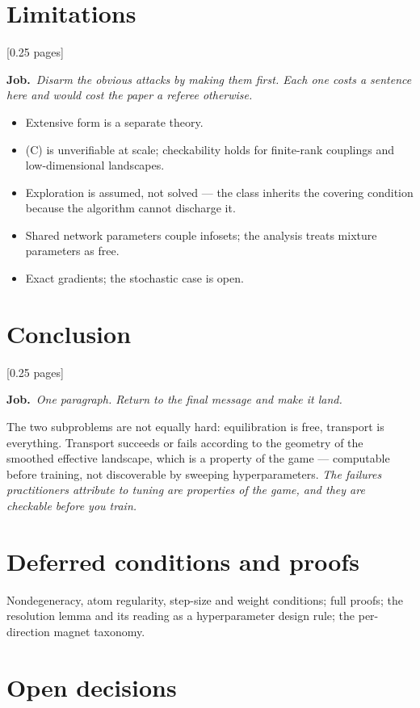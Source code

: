 \documentclass[11pt]{article}
\newcommand{\job}[1]{\par\smallskip\noindent
  \textcolor{jobc}{\textbf{Job.}}\ \emph{#1}\par\smallskip}
\newcommand{\budget}[1]{\hfill{\small\textsf{[#1]}}}
\theoremstyle{definition}
\theoremstyle{remark}
\begin{document}
\section{Limitations}\label{sec:limits}
\budget{0.25 pages}

\job{Disarm the obvious attacks by making them first. Each one costs a sentence
here and would cost the paper a referee otherwise.}
\begin{itemize}[leftmargin=1.2em]
\item Extensive form is a separate theory.
\item (C) is unverifiable at scale; checkability holds for finite-rank couplings
  and low-dimensional landscapes.
\item Exploration is assumed, not solved --- the class inherits the covering
  condition because the algorithm cannot discharge it.
\item Shared network parameters couple infosets; the analysis treats mixture
  parameters as free.
\item Exact gradients; the stochastic case is open.
\end{itemize}

\section{Conclusion}\label{sec:conc}
\budget{0.25 pages}

\job{One paragraph. Return to the final message and make it land.}

\noindent
The two subproblems are not equally hard: equilibration is free, transport is
everything. Transport succeeds or fails according to the geometry of the smoothed
effective landscape, which is a property of the game --- computable before
training, not discoverable by sweeping hyperparameters. \emph{The failures
practitioners attribute to tuning are properties of the game, and they are
checkable before you train.}

\appendix
\section{Deferred conditions and proofs}
Nondegeneracy, atom regularity, step-size and weight conditions; full proofs;
the resolution lemma and its reading as a hyperparameter design rule; the
per-direction magnet taxonomy.

\section{Open decisions}\label{sec:decisions}
\end{document}
